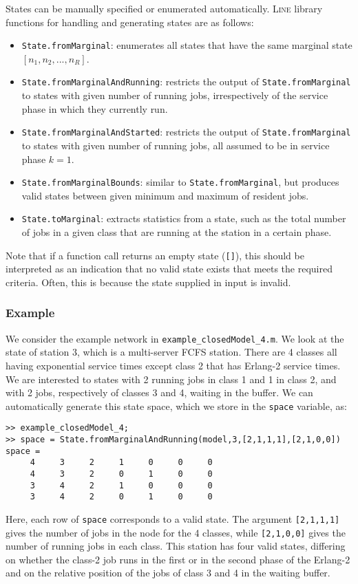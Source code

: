 States can be manually specified or enumerated automatically. \textsc{Line} library functions for handling and generating states are as follows:
\begin{itemize}
\item \texttt{State.fromMarginal}: enumerates all states that have the same marginal state $[n_{1},n_{2},...,n_{R}]$.
\item \texttt{State.fromMarginalAndRunning}: restricts the output of \texttt{State.fromMarginal} to states with given number of running jobs, irrespectively of the service phase in which they currently run.
\item \texttt{State.fromMarginalAndStarted}: restricts the output of \texttt{State.fromMarginal} to states with given number of running jobs, all assumed to be in service phase $k=1$.
\item \texttt{State.fromMarginalBounds}: similar to \texttt{State.fromMarginal}, but produces valid states between given minimum and maximum of resident jobs.
\item \texttt{State.toMarginal}: extracts statistics from a state, such as the total number of jobs in a given class that are running at the station in a certain phase.
\end{itemize}
Note that if a function call returns an empty state (\texttt{[]}), this should be interpreted as an indication that no valid state exists that meets the required criteria. Often, this is because the state supplied in input is invalid.

\subsubsection{Example} We consider the example network in \texttt{example\_closedModel\_4.m}. We look at the state of station 3, which is a multi-server FCFS station. There are 4 classes all having exponential service times except class 2 that has Erlang-2 service times. We are interested to states with 2 running jobs in class 1 and 1 in class 2, and with 2 jobs, respectively of classes 3 and 4, waiting in the buffer. We can automatically generate this state space, which we store in the \texttt{space} variable, as:
\begin{lstlisting}
>> example_closedModel_4;
>> space = State.fromMarginalAndRunning(model,3,[2,1,1,1],[2,1,0,0])
space =
     4     3     2     1     0     0     0
     4     3     2     0     1     0     0
     3     4     2     1     0     0     0
     3     4     2     0     1     0     0
\end{lstlisting}
Here, each row of \texttt{space} corresponds to a valid state. The argument \texttt{[2,1,1,1]} gives the number of jobs in the node for the 4 classes, while \texttt{[2,1,0,0]} gives the number of running jobs in each class. This station has four valid states, differing on whether the class-2 job runs in the first or in the second phase of the Erlang-2 and on the relative position of the jobs of class 3 and 4 in the waiting buffer.

